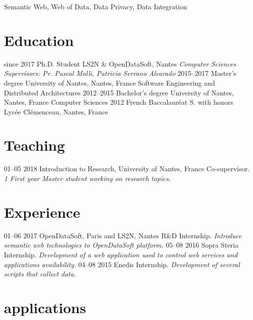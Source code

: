 \documentclass[]{friggeri-cv}
\begin{document}
Semantic Web, Web of Data, Data Privacy, Data Integration

\section{Education}

\begin{entrylist}
  \entry
    {since 2017}
    {Ph.D. Student}
    {LS2N \& OpenDataSoft, Nantes}
    {\emph{Computer Sciences}\\
    \emph{Supervisors: Pr. Pascal Molli, Patricia Serrano Alvarado}}
  \entry
    {2015–2017}
    {Master’s degree}
    {University of Nantes, Nantes, France}
    {Software Engineering and Distributed Architectures}
  \entry
    {2012–2015}
    {Bachelor’s degree}
    {University of Nantes, Nantes, France}
    {Computer Sciences}
  \entry
    {2012}
    {French Baccalauréat S. with honors}
    {Lycée Clémenceau, Nantes, France}
    {}
\end{entrylist}

\section{Teaching}

\begin{entrylist}
  \entry
    {01–05 2018}
    {Introduction to Research, University of Nantes, France}
    {Co-supervisor.}
    {\emph{1 First year Master student working on research topics.}}
 \end{entrylist}

\section{Experience}

\begin{entrylist}
  \entry
    {01–06 2017}
    {OpenDataSoft, Paris and LS2N, Nantes}
    {R\&D Internship.}
    {\emph{Introduce semantic web technologies to OpenDataSoft platform.}}
  \entry
    {05–08 2016}
    {Sopra Steria}
    {Internship.}
    {\emph{Development of a web application used to control web services and applications availability.}}
  \entry
    {04–08 2015}
    {Enedis}
    {Internship.}
    {\emph{Development of several scripts that collect data.}}
\end{entrylist}

\section{applications}
\end{document}
